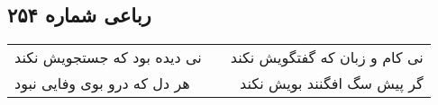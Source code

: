 \begin{center}
\section*{رباعی شماره ۲۵۴}
\label{sec:sh254}
\begin{longtable}{l p{0.5cm} r}
نی دیده بود که جستجویش نکند
&&
نی کام و زبان که گفتگویش نکند
\\
هر دل که درو بوی وفایی نبود
&&
گر پیش سگ افگنند بویش نکند
\\
\end{longtable}
\end{center}
